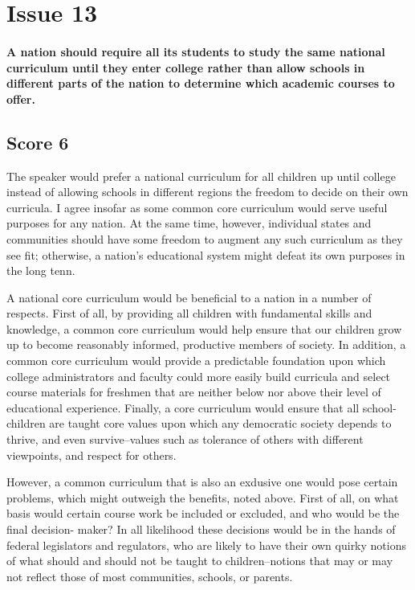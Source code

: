 \section{Issue 13}
\paragraph{
A nation should require all its students to study the same national curriculum until they enter college rather than allow schools in different parts of the nation to determine which academic courses to offer.
}
\subsection{Score 6}


The speaker would prefer a national curriculum for all children up until college instead of allowing schools in different regions the freedom to decide on their own curricula.
I agree insofar as some common core curriculum would serve useful purposes for any nation.
At the same time, however, individual states and communities should have some freedom to augment any such curriculum as they see fit; otherwise, a nation's educational system might defeat its own purposes in the long tenn.


A national core curriculum would be beneficial to a nation in a number of respects.
First of all, by providing all children with fundamental skills and knowledge, a common core curriculum would help ensure that our children grow up to become reasonably informed, productive members of society.
In addition, a common core curriculum would provide a predictable foundation upon which college administrators and faculty could more easily build curricula and select course materials for freshmen that are neither below nor above their level of educational experience.
Finally, a core curriculum would ensure that all school-children are taught core values upon which any democratic society depends to thrive, and even survive--values such as tolerance of others with different viewpoints, and respect for others.


However, a common curriculum that is also an exdusive one would pose certain problems, which might outweigh the benefits, noted above.
First of all, on what basis would certain course work be included or excluded, and who would be the final decision- maker? In all likelihood these decisions would be in the hands of federal legislators and regulators, who are likely to have their own quirky notions of what should and should not be taught to children--notions that may or may not reflect those of most communities, schools, or parents.


